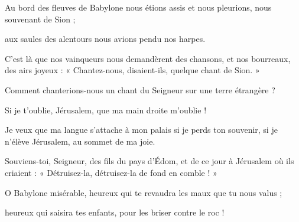 \item Au bord des fleuves de Babylone nous étions assis et nous pleurions, nous souvenant de Sion ; 

\item aux saules des alentours nous avions pendu nos harpes.

\item C'est là que nos vainqueurs nous demandèrent des chansons, et nos bourreaux, des airs joyeux : « Chantez-nous, disaient-ils, quelque chant de Sion. »

\item Comment chanterions-nous un chant du Seigneur sur une terre étrangère ? 

\item Si je t'oublie, Jérusalem, que ma main droite m'oublie !

\item Je veux que ma langue s'attache à mon palais si je perds ton souvenir, si je n'élève Jérusalem, au sommet de ma joie.

\item Souviens-toi, Seigneur, des fils du pays d'Édom, et de ce jour à Jérusalem où ils criaient : « Détruisez-la, détruisez-la de fond en comble ! »

\item O Babylone misérable, heureux qui te revaudra les maux que tu nous valus ; 

\item heureux qui saisira tes enfants, pour les briser contre le roc !